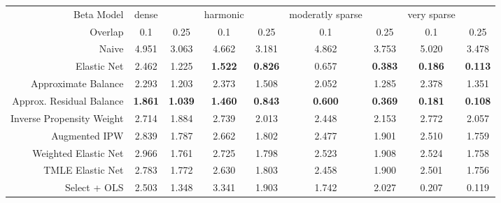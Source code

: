 \begin{table}[ht]
\centering
\begin{tabular}{|r|cc|cc|cc|cc|}
   \hline
Beta Model & dense &  & harmonic &  & moderatly sparse &  & very sparse &  \\ 
  Overlap & 0.1 & 0.25 & 0.1 & 0.25 & 0.1 & 0.25 & 0.1 & 0.25 \\ 
   \hline
Naive & 4.951 & 3.063 & 4.662 & 3.181 & 4.862 & 3.753 & 5.020 & 3.478 \\ 
  Elastic Net & 2.462 & 1.225 &  \bf 1.522 &  \bf 0.826 & 0.657 &  \bf 0.383 &  \bf 0.186 &  \bf 0.113 \\ 
   \hline
Approximate Balance & 2.293 & 1.203 & 2.373 & 1.508 & 2.052 & 1.285 & 2.378 & 1.351 \\ 
  Approx. Residual Balance &  \bf 1.861 &  \bf 1.039 &  \bf 1.460 &  \bf 0.843 &  \bf 0.600 &  \bf 0.369 &  \bf 0.181 &  \bf 0.108 \\ 
   \hline
Inverse Propensity Weight & 2.714 & 1.884 & 2.739 & 2.013 & 2.448 & 2.153 & 2.772 & 2.057 \\ 
  Augmented IPW & 2.839 & 1.787 & 2.662 & 1.802 & 2.477 & 1.901 & 2.510 & 1.759 \\ 
   \hline
Weighted Elastic Net & 2.966 & 1.761 & 2.725 & 1.798 & 2.523 & 1.908 & 2.524 & 1.758 \\ 
  TMLE Elastic Net & 2.783 & 1.772 & 2.630 & 1.803 & 2.458 & 1.900 & 2.501 & 1.756 \\ 
   \hline
Select + OLS & 2.503 & 1.348 & 3.341 & 1.903 & 1.742 & 2.027 & 0.207 & 0.119 \\ 
   \hline
\end{tabular}
\end{table}
